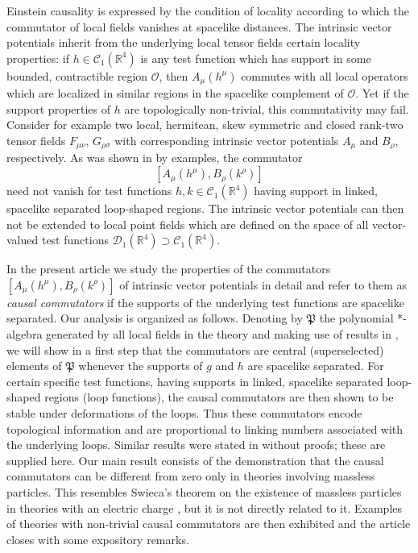 \documentclass[11pt]{article}
\numberwithin{equation}{section}
\newcommand{\RR}{{\mathbb R}}
\newcommand{\Cc}{{\mathcal{C}}}
\newcommand{\Dc}{{\mathcal{D}}}
\newcommand{\Oc}{{\mathcal{O}}}
\newcommand{\fP}{{\mathfrak P}}
\begin{document}
\medskip
Einstein causality is expressed by the condition of locality 
according to which the commutator of local fields vanishes
at spacelike distances. The intrinsic vector potentials inherit
from the underlying local tensor fields certain locality properties:
if $h \in \Cc_1(\RR^4)$ is any test function which has support in some
bounded, contractible region $\Oc$, then $A_\mu(h^\mu)$ 
commutes with all local operators which are localized in similar 
regions in the spacelike complement of $\Oc$. Yet if the 
support properties of $h$ are topologically non-trivial,
this commutativity may fail. Consider for example  
two local, hermitean, skew symmetric and closed 
rank-two tensor fields $F_{\mu \nu}$, $G_{\rho \sigma}$
with corresponding intrinsic vector potentials $A_\mu$ and
$B_\rho$, respectively. As was shown in 
\cite{Roberts,BuCiRuVa2} 
by examples, the commutator 
%
\begin{equation}
\label{eq.comm}
[A_\mu(h^\mu), B_\rho(k^\rho)]
\end{equation}
%
need not vanish for test functions $h, k \in \Cc_1(\RR^4)$
having support in linked, spacelike separated loop-shaped 
regions. The intrinsic vector potentials can then
not be extended to local point fields 
which are defined on the space of 
all vector-valued test functions $\Dc_1(\RR^4) \supset \Cc_1(\RR^4)$. 

\medskip
In the present article we study the properties 
of the commutators $[A_\mu(h^\mu), B_\rho(k^\rho)]$ 
of intrinsic vector potentials in detail and refer to them as
\textit{causal commutators} if the supports of the
underlying test functions are spacelike \mbox{separated}. 
Our analysis is organized as follows. 
Denoting by $\fP$ the \mbox{polynomial} *-algebra generated by 
all local fields in the theory and making use of results in 
\cite{BuCiRuVa1}, we will show in a first step that the commutators are
central (superselected) elements of $\fP$ whenever the supports of 
$g$ and $h$ are spacelike separated. For certain specific 
test functions, having supports in linked, spacelike separated 
loop-shaped regions (loop functions), the causal commutators are 
then shown to be stable under deformations of the loops.
Thus these commutators encode topological information
and are proportional to linking numbers associated
with the underlying loops. Similar results were stated in 
\cite{Roberts} without proofs; these are supplied here. 
Our main result consists 
of the demonstration that the causal commutators can be different from zero 
only in theories involving massless particles. 
This resembles Swieca's theorem on the existence 
of massless particles in theories with an electric charge
\cite{Sw}, but it is not directly related to it. 
Examples of theories with non-trivial causal commutators 
are then exhibited and the article closes with some 
expository remarks. 
\end{document}
